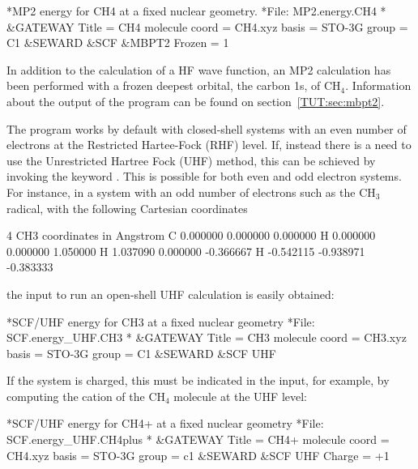 \begin{inputlisting}
*MP2 energy for CH4 at a fixed nuclear geometry.
*File: MP2.energy.CH4
*
&GATEWAY
 Title = CH4 molecule
 coord = CH4.xyz 
 basis = STO-3G 
 group = C1
&SEWARD 
&SCF
&MBPT2 
 Frozen = 1
\end{inputlisting}

In addition to the calculation of a HF wave function, an MP2 calculation has been performed with 
a frozen deepest orbital, the carbon 1s, of CH$_4$. Information about the output
of the  program can be found on section~\ref{TUT:sec:mbpt2}.

The  program works by default with closed-shell systems with an
even number of electrons at the Restricted Hartee-Fock (RHF) level. If, 
instead there is a need to use the Unrestricted Hartree Fock (UHF) method, this can be schieved by invoking the
keyword . This is possible for both even and odd electron systems. 
For instance, in a system with an odd number of electrons such as the CH$_3$ radical, with the 
following Cartesian coordinates

\begin{inputlisting}
4
CH3 coordinates in Angstrom 
C    0.000000     0.000000     0.000000
H    0.000000     0.000000     1.050000
H    1.037090     0.000000    -0.366667
H   -0.542115    -0.938971    -0.383333
\end{inputlisting}

the input to run an open-shell UHF calculation is easily obtained:

\begin{inputlisting}
*SCF/UHF energy for CH3 at a fixed nuclear geometry
*File: SCF.energy_UHF.CH3
*
&GATEWAY
 Title = CH3 molecule
 coord = CH3.xyz 
 basis = STO-3G 
 group = C1
&SEWARD
&SCF 
 UHF
\end{inputlisting}

If the system is charged, this must be indicated in the 
 input, for example,  by computing the cation of the CH$_4$ molecule 
at the UHF level:

\begin{inputlisting}
*SCF/UHF energy for CH4+ at a fixed nuclear geometry
*File: SCF.energy_UHF.CH4plus
*
&GATEWAY
 Title = CH4+ molecule
 coord = CH4.xyz 
 basis = STO-3G 
 group = c1
&SEWARD
&SCF
 UHF
 Charge = +1
\end{inputlisting}

